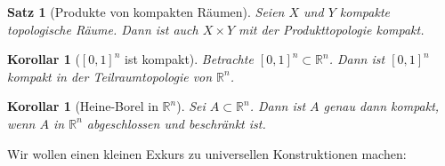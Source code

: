 \documentclass[a4paper,12pt]{article}
\theoremstyle{break}
\newtheorem{theorem}[definition]{Satz}
\newtheorem{corollary}[definition]{Korollar}
\begin{document}
\begin{theorem}[Produkte von kompakten Räumen]
Seien $X$ und $Y$ kompakte topologische Räume. Dann ist auch $X \times Y$ mit der Produkttopologie kompakt.
\end{theorem}

\begin{corollary}[{$[0,1]^n$} ist kompakt]
Betrachte $[0,1]^n \subset \mathbb{R}^n$. Dann ist $[0,1]^n$ kompakt in der Teilraumtopologie von $\mathbb{R}^n$.
\end{corollary}

\begin{corollary}[Heine-Borel in $\mathbb{R}^n$]
Sei $A \subset \mathbb{R}^n$. Dann ist $A$ genau dann kompakt, wenn $A$ in $\mathbb{R}^n$ abgeschlossen und beschränkt ist.
\end{corollary}

Wir wollen einen kleinen Exkurs zu universellen Konstruktionen machen:
\end{document}
